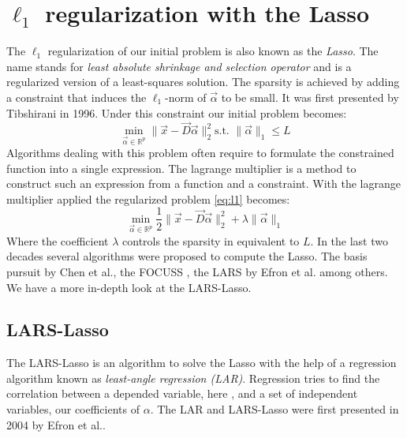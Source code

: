\section { $\ell_1$ regularization with the Lasso}
The $\ell_1$ regularization of our initial problem is also known as the
\emph{Lasso}. The name stands for \emph{least absolute shrinkage and
selection operator} and is a regularized version of a least-squares
solution. The sparsity is achieved by adding a constraint that induces
the $\ell_1$-norm of $\vec{\alpha}$ to be small. It was first
presented by
Tibshirani
in 1996\cite{Tibshirani1996}. Under this constraint our initial problem becomes:
\begin{equation}
\min_{\vec{\alpha}\in\mathbb{R}^{p}} \lVert \vec{x} - \vec{D}\vec{\alpha}
\rVert^{2}_{2} \textrm{
s.t. } \lVert \vec{\alpha} \rVert_{1} \leq L \label{eq:l1}
\end{equation}
Algorithms dealing with this problem often require to formulate the
constrained function into a single expression. The lagrange multiplier is a
method to construct such an expression from a function and a constraint. With
the  lagrange multiplier applied the regularized problem \ref{eq:l1} becomes:
\begin{equation}
\min_{\vec{\alpha}\in\mathbb{R}^{p}}  \frac{1}{2} \lVert \vec{x} -
\vec{D}\vec{\alpha} \rVert^{2}_{2} +
\lambda \lVert \vec{\alpha} \rVert_{1}\label{eq:l1lagrange}
\end{equation}
Where the coefficient $\lambda$ controls the sparsity in equivalent to $L$.
In the last two decades several algorithms were proposed to compute the
Lasso. The basis pursuit by Chen et al.\cite{Chen1995}, the FOCUSS\cite{FOCUSS}
, the LARS by Efron et al.\cite{Efron2004} among others. We have a more in-depth
look at the LARS-Lasso.


\subsection{LARS-Lasso}
\label{sec:lars}
The LARS-Lasso is an algorithm to solve the Lasso with the help of a regression
algorithm known as \emph{least-angle regression (LAR)}. Regression tries to find
the correlation between a depended variable, here , and
a set of independent variables, our coefficients of $\alpha$.
The LAR and LARS-Lasso were first presented in 2004 by Efron et
al.\cite{Efron2004}.


